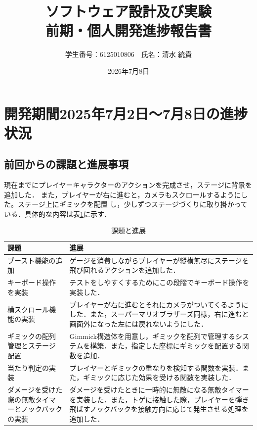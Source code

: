 \documentclass{jsarticle}
\title{ソフトウェア設計及び実験\\前期・個人開発進捗報告書}
\author{学生番号：6125010806　氏名：清水 統貴}
\date{2026年7月8日}
\begin{document}
\maketitle

\section{開発期間2025年7月2日～7月8日の進捗状況}
%

\subsection{前回からの課題と進展事項}
%
現在までにプレイヤーキャラクターのアクションを完成させ，ステージに背景を追加した．
また，プレイヤーが右に進むと，カメラもスクロールするようにした。ステージ上にギミックを配置
し，少しずつステージづくりに取り掛かっている．具体的な内容は表\ref{table1}に示す．

\begin{table}[htb]
\begin{center}
\caption{課題と進展}
\label{table1}
\begin{tabular}{|p{7cm}|p{7cm}|}\hline
課題 & 進展 \\ \hline \hline
ブースト機能の追加 & ゲージを消費しながらプレイヤーが縦横無尽にステージを飛び回れるアクションを追加した． \\ \hline
キーボード操作を実装 & テストをしやすくするためにこの段階でキーボード操作を実装した． \\ \hline
横スクロール機能の実装 & プレイヤーが右に進むとそれにカメラがついてくるようにした．また，スーパーマリオブラザーズ同様，右に進むと画面外になった左には戻れないようにした． \\ \hline
ギミックの配列管理とステージ配置 & Gimmick構造体を用意し，ギミックを配列で管理するシステムを構築．また，指定した座標にギミックを配置する関数を追加． \\ \hline
当たり判定の実装 & プレイヤーとギミックの重なりを検知する関数を実装．また，ギミックに応じた効果を受ける関数を実装した． \\ \hline
ダメージを受けた際の無敵タイマーとノックバックの実装 & ダメージを受けたときに一時的に無敵になる無敵タイマーを実装した．また，トゲに接触した際，プレイヤーを弾き飛ばすノックバックを接触方向に応じて発生させる処理を追加した． \\ \hline 
\end{tabular}
\end{center}
\end{table}
\end{document}
